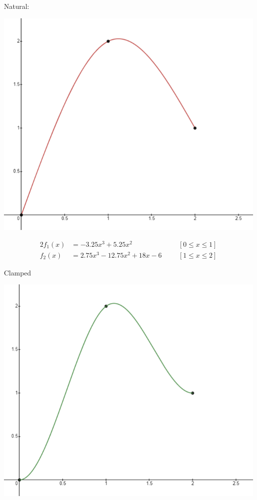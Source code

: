 \documentclass[11pt]{article}
\begin{document}
\begin{enumerate}
            \begin{minipage}[t]{0.42\linewidth}
                {\footnotesize
                    Natural:
                }\\
                \begin{center}
                    \includegraphics[width=.8\linewidth]{natural.png}
                \end{center}
                {\footnotesize
                    \begin{alignat*}{2}
                        f_1(x) &= -3.25x^3 + 5.25x^2 \;\;\; &&\left[ 0 \leq x \leq 1 \right] \\
                        f_2(x) &= 2.75x^3 - 12.75x^2 + 18x -6 \;\;\; &&\left[ 1 \leq x \leq 2 \right]
                    \end{alignat*}
                }
            \end{minipage} \hfill\vline\hfill %
            \begin{minipage}[t]{0.42\linewidth}
                {\footnotesize
                    Clamped
                }\\
                \begin{center}
                    \includegraphics[width=.8\linewidth]{clamped.png}

\end{center}
\end{minipage}
\end{enumerate}
\end{document}

